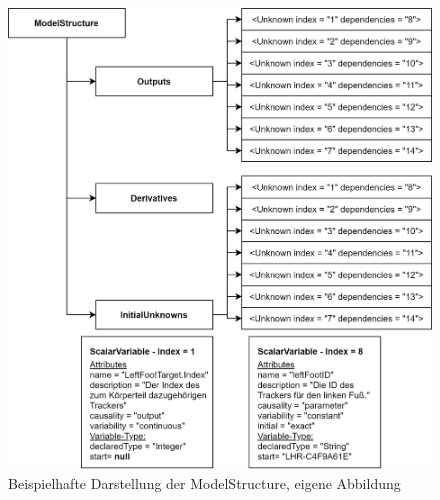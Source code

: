 \begin{figure}[h]
	\centering
	\includegraphics[width=0.85\linewidth]{Bilder/A31_ModelStructure}
	\caption{Beispielhafte Darstellung der ModelStructure, eigene Abbildung}
	\label{fig:ModelStructure}
\end{figure}

